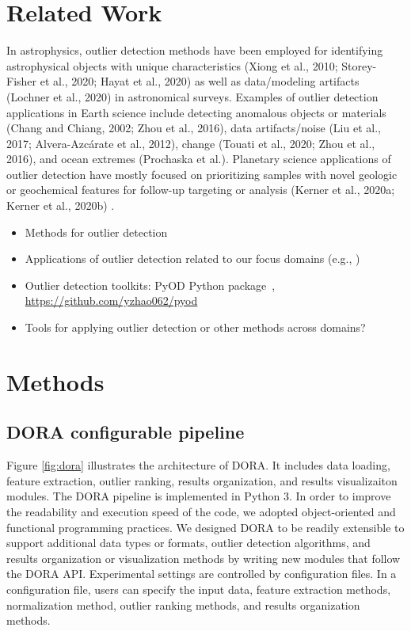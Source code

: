 \documentclass[letterpaper]{article} %
\begin{document}
\section{Related Work}
In astrophysics, 
    outlier detection methods have been employed for identifying astrophysical
     objects with unique characteristics (Xiong et al., 2010; 
     Storey-Fisher et al., 2020; Hayat et al., 2020) as well as 
     data/modeling artifacts~\citep{wagstaff:des-anom20} (Lochner et al., 2020) in 
     astronomical surveys. Examples of outlier detection applications in 
     Earth science include detecting anomalous objects or materials 
     (Chang and Chiang, 2002; Zhou et al., 2016), data artifacts/noise 
     (Liu et al., 2017; Alvera-Azcárate et al., 2012), change (Touati et al.,
      2020; Zhou et al., 2016),  and ocean extremes (Prochaska et al.). 
      Planetary science applications of outlier detection have mostly focused 
      on prioritizing samples with novel geologic or geochemical features for
       follow-up targeting or analysis (Kerner et al., 2020a; Kerner et al., 
       2020b) \citep{wagstaff:demud13}.

\begin{itemize}
\item Methods for outlier detection
\item Applications of outlier detection related to our focus domains 
(e.g., \citet{kerner2020comparison})
\item Outlier detection toolkits: PyOD Python
package~\citep{zhao:pyod19}, \url{https://github.com/yzhao062/pyod} 
\item Tools for applying outlier detection or other methods across
domains?
\end{itemize}

\section{Methods}

\subsection{DORA configurable pipeline} 
Figure \ref{fig:dora} illustrates the architecture of DORA. It includes 
data loading, feature extraction, outlier ranking, results organization, and 
results visualizaiton modules. The DORA pipeline is implemented in Python 3.
In order to improve the readability and execution speed of the code, we adopted
object-oriented and functional programming practices.  We designed DORA to be 
readily extensible to support additional data types or formats, outlier detection 
algorithms, and results organization or visualization methods by writing new 
modules that follow the DORA API. Experimental settings are controlled by 
configuration files. In a configuration file, users can specify the input data, 
feature extraction methods, normalization method, outlier ranking methods, and 
results organization methods. 
\end{document}

